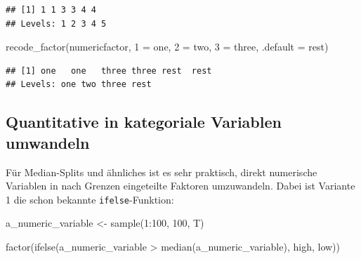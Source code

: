 \documentclass[
]{book}
\newenvironment{Shaded}{\begin{snugshade}}{\end{snugshade}}
\newcommand{\AttributeTok}[1]{\textcolor[rgb]{0.77,0.63,0.00}{#1}}
\newcommand{\DecValTok}[1]{\textcolor[rgb]{0.00,0.00,0.81}{#1}}
\newcommand{\FunctionTok}[1]{\textcolor[rgb]{0.00,0.00,0.00}{#1}}
\newcommand{\NormalTok}[1]{#1}
\newcommand{\OtherTok}[1]{\textcolor[rgb]{0.56,0.35,0.01}{#1}}
\newcommand{\SpecialCharTok}[1]{\textcolor[rgb]{0.00,0.00,0.00}{#1}}
\newcommand{\StringTok}[1]{\textcolor[rgb]{0.31,0.60,0.02}{#1}}
\begin{document}
\begin{verbatim}
## [1] 1 1 3 3 4 4
## Levels: 1 2 3 4 5
\end{verbatim}

\begin{Shaded}
\begin{Highlighting}[]
\FunctionTok{recode\_factor}\NormalTok{(numericfactor,}
              \StringTok{\textquotesingle{}1\textquotesingle{}} \OtherTok{=} \StringTok{\textquotesingle{}one\textquotesingle{}}\NormalTok{,}
              \StringTok{\textquotesingle{}2\textquotesingle{}} \OtherTok{=} \StringTok{\textquotesingle{}two\textquotesingle{}}\NormalTok{,}
              \StringTok{\textquotesingle{}3\textquotesingle{}} \OtherTok{=} \StringTok{\textquotesingle{}three\textquotesingle{}}\NormalTok{,}
              \AttributeTok{.default =} \StringTok{\textquotesingle{}rest\textquotesingle{}}\NormalTok{)}
\end{Highlighting}
\end{Shaded}

\begin{verbatim}
## [1] one   one   three three rest  rest 
## Levels: one two three rest
\end{verbatim}

\hypertarget{quantitative-in-kategoriale-variablen-umwandeln}{%
\subsection{Quantitative in kategoriale Variablen umwandeln}\label{quantitative-in-kategoriale-variablen-umwandeln}}

Für Median-Splits und ähnliches ist es sehr praktisch, direkt numerische Variablen in nach Grenzen eingeteilte Faktoren umzuwandeln. Dabei ist Variante 1 die schon bekannte \texttt{ifelse}-Funktion:

\begin{Shaded}
\begin{Highlighting}[]
\NormalTok{a\_numeric\_variable }\OtherTok{\textless{}{-}} \FunctionTok{sample}\NormalTok{(}\DecValTok{1}\SpecialCharTok{:}\DecValTok{100}\NormalTok{, }\DecValTok{100}\NormalTok{, T)}


\FunctionTok{factor}\NormalTok{(}\FunctionTok{ifelse}\NormalTok{(a\_numeric\_variable }\SpecialCharTok{\textgreater{}} \FunctionTok{median}\NormalTok{(a\_numeric\_variable),}
              \StringTok{\textquotesingle{}high\textquotesingle{}}\NormalTok{,}
              \StringTok{\textquotesingle{}low\textquotesingle{}}\NormalTok{))}
\end{Highlighting}
\end{Shaded}
\end{document}
